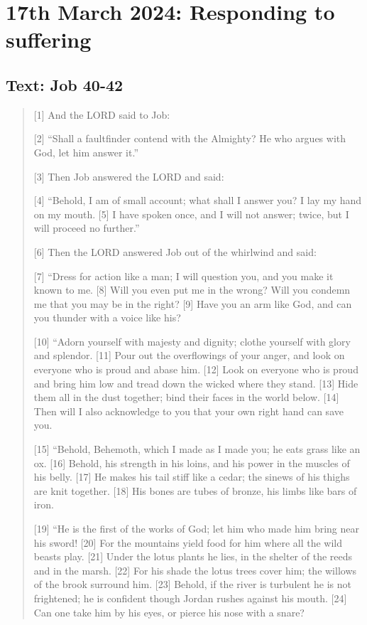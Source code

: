 \setcounter{figure}{0}

\section{17th March 2024: Responding to suffering}
\subsection*{Text: Job 40-42}
  \begin{quote}
    [1] And the LORD said to Job:

    [2] “Shall a faultfinder contend with the Almighty?
        He who argues with God, let him answer it.”


      [3] Then Job answered the LORD and said:

    [4] “Behold, I am of small account; what shall I answer you?
        I lay my hand on my mouth.
    [5] I have spoken once, and I will not answer;
        twice, but I will proceed no further.”


      [6] Then the LORD answered Job out of the whirlwind and said:

    [7] “Dress for action like a man;
        I will question you, and you make it known to me.
    [8] Will you even put me in the wrong?
        Will you condemn me that you may be in the right?
    [9] Have you an arm like God,
        and can you thunder with a voice like his?


    [10] “Adorn yourself with majesty and dignity;
        clothe yourself with glory and splendor.
    [11] Pour out the overflowings of your anger,
        and look on everyone who is proud and abase him.
    [12] Look on everyone who is proud and bring him low
        and tread down the wicked where they stand.
    [13] Hide them all in the dust together;
        bind their faces in the world below.
    [14] Then will I also acknowledge to you
        that your own right hand can save you.


    [15] “Behold, Behemoth,
        which I made as I made you;
        he eats grass like an ox.
    [16] Behold, his strength in his loins,
        and his power in the muscles of his belly.
    [17] He makes his tail stiff like a cedar;
        the sinews of his thighs are knit together.
    [18] His bones are tubes of bronze,
        his limbs like bars of iron.


    [19] “He is the first of the works of God;
        let him who made him bring near his sword!
    [20] For the mountains yield food for him
        where all the wild beasts play.
    [21] Under the lotus plants he lies,
        in the shelter of the reeds and in the marsh.
    [22] For his shade the lotus trees cover him;
        the willows of the brook surround him.
    [23] Behold, if the river is turbulent he is not frightened;
        he is confident though Jordan rushes against his mouth.
    [24] Can one take him by his eyes,
        or pierce his nose with a snare?


\end{quote}
